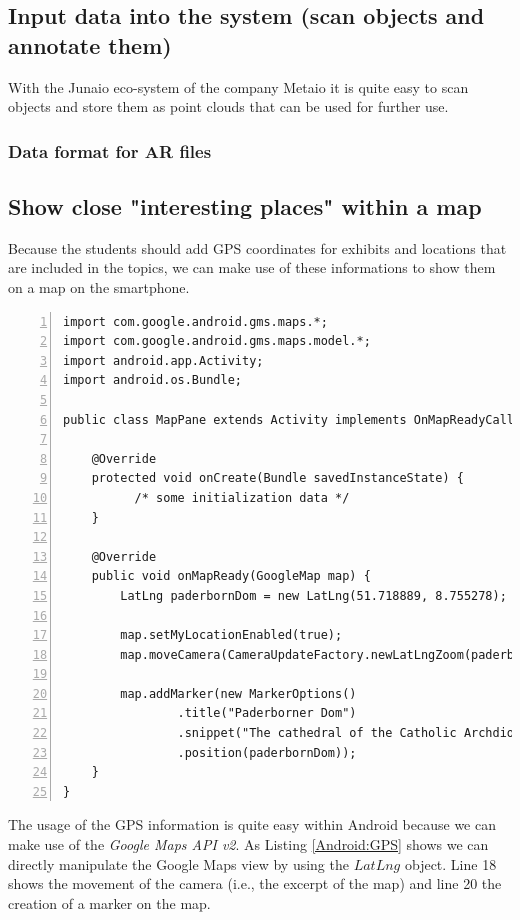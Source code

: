 \subsection{Input data into the system (scan objects and annotate them)} 
With the Junaio eco-system of the company Metaio it is quite easy to scan objects and store them as point clouds that can be used for further use. 

\subsubsection{Data format for \ac{AR} files}


\subsection{Show close "interesting places" within a map} 
Because the students should add \ac{GPS} coordinates for exhibits and locations that are included in the topics, we can make use of these informations to show them on a map on the smartphone. 

\begin{lstlisting}[numbers=left,caption={Example for using the GPS coordinates within an Android application},label=Android:GPS,frame=tlbr,breaklines]
import com.google.android.gms.maps.*;
import com.google.android.gms.maps.model.*;
import android.app.Activity;
import android.os.Bundle;

public class MapPane extends Activity implements OnMapReadyCallback {

    @Override
    protected void onCreate(Bundle savedInstanceState) {
	      /* some initialization data */
    }

    @Override
    public void onMapReady(GoogleMap map) {
        LatLng paderbornDom = new LatLng(51.718889, 8.755278);

        map.setMyLocationEnabled(true);
        map.moveCamera(CameraUpdateFactory.newLatLngZoom(paderbornDom, 13));

        map.addMarker(new MarkerOptions()
                .title("Paderborner Dom")
                .snippet("The cathedral of the Catholic Archdiocese of Paderborn")
                .position(paderbornDom));
    }
}
\end{lstlisting}

The usage of the \ac{GPS} information is quite easy within Android because we can make use of the \emph{Google Maps API v2}. As Listing \ref{Android:GPS} shows we can directly manipulate the Google Maps view by using the $LatLng$ object. Line 18 shows the movement of the camera (i.e., the excerpt of the map) and line 20 the creation of a marker on the map. 

